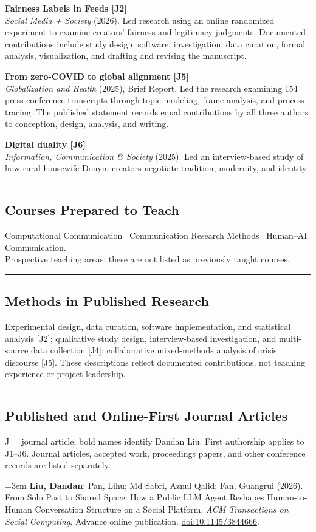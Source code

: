 \documentclass[a4paper,11pt]{article}
\newcommand{\sep}{{\,\textperiodcentered\,\,}}
\newcommand{\hsep}{\noindent\textcolor{teal}{\rule{\textwidth}{0.5pt}}}
\newcommand{\block}[1]{\par\addvspace{7pt}\Needspace{5\baselineskip}\hsep\vspace{-8pt}\subsection*{#1}}
\newcommand{\publication}[2]{%
  \par\addvspace{8pt}\noindent
  \begin{minipage}{\linewidth}
    \fontsize{10.8}{13.4}\selectfont\raggedright
    \hangindent=3em\hangafter=1
    \makebox[3em][l]{\textcolor{teal}{[#1]}}#2
  \end{minipage}\par}
\begin{document}
\textbf{\textquotedbl{}Fairness Labels\textquotedbl{} in Feeds [J2]}\\
{\small \emph{Social Media + Society} (2026). Led research using an online randomized experiment to examine creators' fairness and legitimacy judgments. Documented contributions include study design, software, investigation, data curation, formal analysis, visualization, and drafting and revising the manuscript.}

\textbf{From zero-COVID to global alignment [J5]}\\
{\small \emph{Globalization and Health} (2025), Brief Report. Led the research examining 154 press-conference transcripts through topic modeling, frame analysis, and process tracing. The published statement records equal contributions by all three authors to conception, design, analysis, and writing.}

\textbf{Digital duality [J6]}\\
{\small \emph{Information, Communication \& Society} (2025). Led an interview-based study of how rural housewife Douyin creators negotiate tradition, modernity, and identity.}

\clearpage
\block{Courses Prepared to Teach}
{\small Computational Communication \sep Communication Research Methods \sep Human--AI Communication.\\
Prospective teaching areas; these are not listed as previously taught courses.}

\block{Methods in Published Research}
{\small Experimental design, data curation, software implementation, and statistical analysis [J2]; qualitative study design, interview-based investigation, and multi-source data collection [J4]; collaborative mixed-methods analysis of crisis discourse [J5]. These descriptions reflect documented contributions, not teaching experience or project leadership.}

\block{Published and Online-First Journal Articles}
{\small J = journal article; bold names identify Dandan Liu. First authorship applies to J1--J6. Journal articles, accepted work, proceedings papers, and other conference records are listed separately.}\par
\publication{J1}{\textbf{Liu, Dandan}; Pan, Lihu; Md Sabri, Aznul Qalid; Fan, Guangrui (2026). From Solo Post to Shared Space: How a Public LLM Agent Reshapes Human-to-Human Conversation Structure on a Social Platform. \emph{ACM Transactions on Social Computing}. Advance online publication. \href{https://doi.org/10.1145/3844666}{doi:10.1145/3844666}.}
\end{document}
